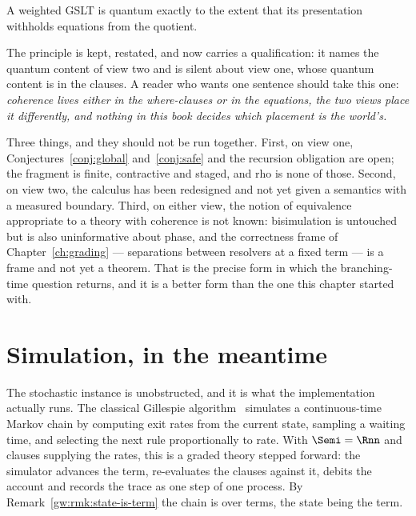 \begin{principle}
\label{wt:prin:slogan}
A weighted GSLT is quantum exactly to the extent that its presentation
withholds equations from the quotient.
\end{principle}

The principle is kept, restated, and now carries a qualification: it names
the quantum content of view two and is silent about view one, whose quantum
content is in the clauses.  A reader who wants one sentence should take
this one: \emph{coherence lives either in the where-clauses or in the
equations, the two views place it differently, and nothing in this book
decides which placement is the world's.}

\begin{remark}
\label{rmk:coherence-gaps}
Three things, and they should not be run together.  First, on view one,
Conjectures~\ref{conj:global} and~\ref{conj:safe} and the recursion
obligation are open; the fragment is finite, contractive and staged, and
rho is none of those.  Second, on view two, the calculus has been redesigned
and not yet given a semantics with a measured boundary.  Third, on either
view, the notion of equivalence appropriate to a theory with coherence is
not known: bisimulation is untouched but is also uninformative about phase,
and the correctness frame of Chapter~\ref{ch:grading} ---
separations between resolvers at a fixed term --- is a frame and not yet a
theorem.  That is the precise form in which the branching-time question
returns, and it is a better form than the one this chapter started with.
\end{remark}

\section{Simulation, in the meantime}

The stochastic instance is unobstructed, and it is what the implementation
actually runs.  The classical Gillespie algorithm~\cite{gillespie1977exact}
simulates a continuous-time Markov chain by computing exit rates from the
current state, sampling a waiting time, and selecting the next rule
proportionally to rate.  With $\Semi = \Rnn$ and clauses supplying the
rates, this is a graded theory stepped forward: the simulator advances the
term, re-evaluates the clauses against it, debits the account and records
the trace as one step of one process.  By Remark~\ref{gw:rmk:state-is-term}
the chain is over terms, the state being the term.

